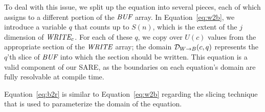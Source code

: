 To deal with this issue, we split up the equation into several pieces,
each of which assigns to a different portion of the $\mbox{\it BUF}$ array.
In Equation~\ref{eq:w2b}, we introduce a variable $q$ that counts up
to $S(n)$, which is the extent of the $j$ dimension of $\mbox{\it WRITE}_c$.
For each of these $q$, we copy over $U(c)$ values from the appropriate
section of the $\mbox{\it WRITE}$ array; the domain ${\cal D}_{W \rightarrow
B}(c,q)$ represents the $q$'th slice of $\mbox{\it BUF}$ into which the
section should be written.  This equation is a valid component of our
SARE, as the boundaries on each equation's domain are fully resolvable
at compile time.

Equation~\ref{eq:b2r} is similar to Equation~\ref{eq:w2b} regarding
the slicing technique that is used to parameterize the domain of the
equation.

















